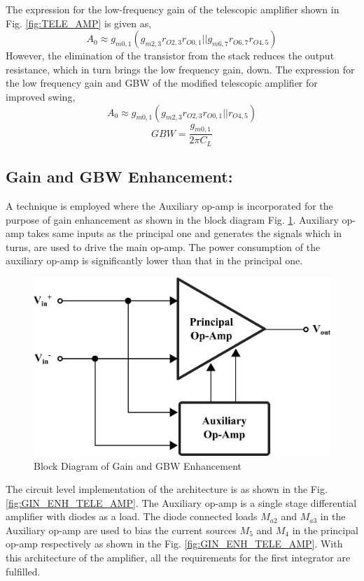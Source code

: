 The expression for the low-frequency gain of the telescopic amplifier shown in Fig. \ref{fig:TELE_AMP} is given as,
%
\begin{equation}
    A_0 \approx g_{m0,1}\left(g_{m2,3}r_{O2,3}r_{O0,1}||g_{m6,7}r_{O6,7}r_{O4,5}\right)
\end{equation}
%
However, the elimination of the transistor from the stack reduces the output resistance, which in turn brings the low frequency gain, down. The expression for the low frequency gain and GBW of the modified telescopic amplifier for improved swing,
%
\begin{equation}\label{eq:A_0_swing_improve}
    A_0 \approx g_{m0,1}\left(g_{m2,3}r_{O2,3}r_{O0,1}||r_{O4,5}\right)
\end{equation}
%
%
\begin{equation}
    GBW = \frac{g_{m0,1}}{2\pi C_L}
\end{equation}
%
\subsection{Gain and GBW Enhancement:}
A technique is employed where the Auxiliary op-amp is incorporated for the purpose of gain enhancement\cite{ISCAS_PEREZ} as shown in the block diagram Fig. \ref{BLK_GIN_ENH}. Auxiliary op-amp takes same inputs as the principal one and generates the signals which in turns, are used to drive the main op-amp. The power consumption of the auxiliary op-amp is significantly lower than that in the principal one.
\begin{figure}[h]
\centering
\includegraphics[width=0.6\columnwidth]{Chap05/Figures/block_diagram_gain_enhancement.png}
\caption{Block Diagram of Gain and GBW Enhancement}
\label{BLK_GIN_ENH}
\end{figure}

The circuit level implementation of the architecture is as shown in the Fig. \ref{fig:GIN_ENH_TELE_AMP}. The Auxiliary op-amp is a single stage differential amplifier with diodes as a load. The diode connected loads $M_{a2}$ and $M_{a3}$ in the Auxiliary op-amp are used to bias the current sources $M_5$ and $M_4$ in the principal op-amp respectively as shown in the Fig. \ref{fig:GIN_ENH_TELE_AMP}. With this architecture of the amplifier, all the requirements for the first integrator are fulfilled.

